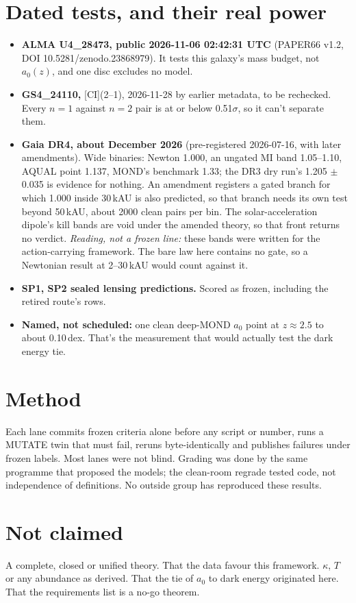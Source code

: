 \documentclass[10pt]{article}
\begin{document}
\section{Dated tests, and their real power}
\begin{itemize}
\item \textbf{ALMA U4\_28473, public 2026-11-06 02:42:31 UTC} (PAPER66 v1.2, DOI 10.5281/zenodo.23868979). It tests this galaxy's mass budget, not $a_0(z)$, and one disc excludes no model.
\item \textbf{GS4\_24110,} [CI](2--1), 2026-11-28 by earlier metadata, to be rechecked. Every $n=1$ against $n=2$ pair is at or below 0.51$\sigma$, so it can't separate them.
\item \textbf{Gaia DR4, about December 2026} (pre-registered 2026-07-16, with later amendments). Wide binaries: Newton 1.000, an ungated MI band 1.05--1.10, AQUAL point 1.137, MOND's benchmark 1.33; the DR3 dry run's 1.205 $\pm$ 0.035 is evidence for nothing. An amendment registers a gated branch for which 1.000 inside 30\,kAU is also predicted, so that branch needs its own test beyond 50\,kAU, about 2000 clean pairs per bin. The solar-acceleration dipole's kill bands are void under the amended theory, so that front returns no verdict. \emph{Reading, not a frozen line:} these bands were written for the action-carrying framework. The bare law here contains no gate, so a Newtonian result at 2--30\,kAU would count against it.
\item \textbf{SP1, SP2 sealed lensing predictions.} Scored as frozen, including the retired route's rows.
\item \textbf{Named, not scheduled:} one clean deep-MOND $a_0$ point at $z\approx2.5$ to about 0.10\,dex. That's the measurement that would actually test the dark energy tie.
\end{itemize}

\section{Method}
Each lane commits frozen criteria alone before any script or number, runs a MUTATE twin that must fail, reruns byte-identically and publishes failures under frozen labels. Most lanes were not blind. Grading was done by the same programme that proposed the models; the clean-room regrade tested code, not independence of definitions. No outside group has reproduced these results.

\section*{Not claimed}
A complete, closed or unified theory. That the data favour this framework. $\kappa$, $T$ or any abundance as derived. That the tie of $a_0$ to dark energy originated here. That the requirements list is a no-go theorem.
\end{document}
